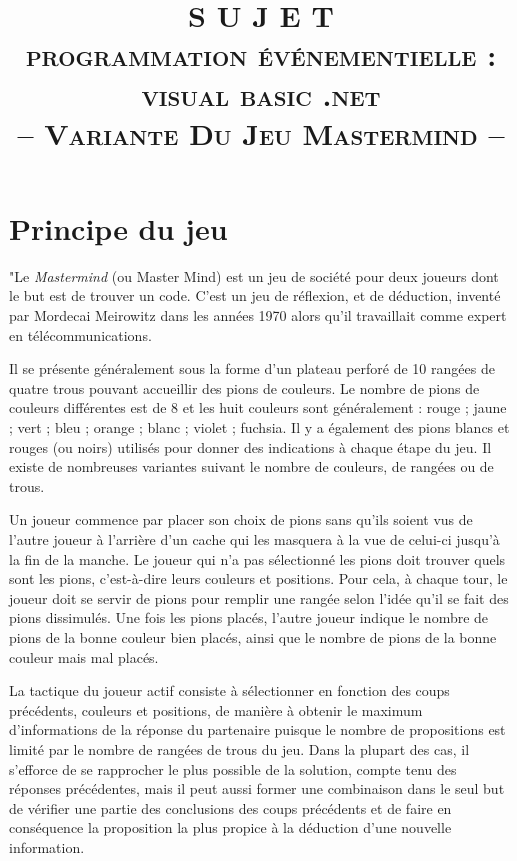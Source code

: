 \documentclass[10pt,a4paper,oneside]{article}
\begin{document}
\date{}
\author{}
\title{
    \vspace{-1.5cm}
    S U J E T\\
    {\Large \textsc{programmation événementielle : visual basic .net}}\\
    \vspace{3 mm}
    {\Large -- \textsc{Variante Du Jeu Mastermind} --}\\
}

\maketitle

\vspace{-2.1cm}

\section{Principe du jeu}
"Le {\em Mastermind} (ou Master Mind) est un jeu de société pour deux joueurs dont le but est de trouver un code. C'est un jeu de réflexion, et de déduction, inventé par Mordecai Meirowitz dans les années 1970 alors qu'il travaillait comme expert en télécommunications.

\medskip

Il se présente généralement sous la forme d'un plateau perforé de 10 rangées de quatre trous pouvant accueillir des pions de couleurs. Le nombre de pions de couleurs différentes est de 8 et les huit couleurs sont généralement : rouge ; jaune ; vert ; bleu ; orange ; blanc ; violet ; fuchsia. Il y a également des pions blancs et rouges (ou noirs) utilisés pour donner des indications à chaque étape du jeu. Il existe de nombreuses variantes suivant le nombre de couleurs, de rangées ou de trous.

\medskip

Un joueur commence par placer son choix de pions sans qu'ils soient vus de l'autre joueur à l'arrière d'un cache qui les masquera à la vue de celui-ci jusqu'à la fin de la manche. Le joueur qui n'a pas sélectionné les pions doit trouver quels sont les pions, c'est-à-dire leurs couleurs et positions. Pour cela, à chaque tour, le joueur doit se servir de pions pour remplir une rangée selon l'idée qu'il se fait des pions dissimulés. Une fois les pions placés, l'autre joueur indique le nombre de pions de la bonne couleur bien placés, ainsi que le nombre de pions de la bonne couleur mais mal placés.

\medskip

La tactique du joueur actif consiste à sélectionner en fonction des coups précédents, couleurs et positions, de manière à obtenir le maximum d'informations de la réponse du partenaire puisque le nombre de propositions est limité par le nombre de rangées de trous du jeu. Dans la plupart des cas, il s'efforce de se rapprocher le plus possible de la solution, compte tenu des réponses précédentes, mais il peut aussi former une combinaison dans le seul but de vérifier une partie des conclusions des coups précédents et de faire en conséquence la proposition la plus propice à la déduction d'une nouvelle information.
\end{document}
